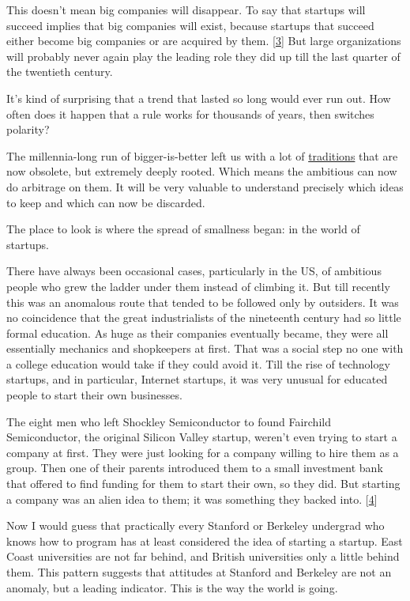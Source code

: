 This doesn't mean big companies will disappear. To say that startups
will succeed implies that big companies will exist, because startups
that succeed either become big companies or are acquired by them.
{[}\hyperref[f3n]{3}{]} But large organizations will probably never
again play the leading role they did up till the last quarter of the
twentieth century.

It's kind of surprising that a trend that lasted so long would ever run
out. How often does it happen that a rule works for thousands of years,
then switches polarity?

The millennia-long run of bigger-is-better left us with a lot of
\href{credentials.html}{traditions} that are now obsolete, but extremely
deeply rooted. Which means the ambitious can now do arbitrage on them.
It will be very valuable to understand precisely which ideas to keep and
which can now be discarded.

The place to look is where the spread of smallness began: in the world
of startups.

There have always been occasional cases, particularly in the US, of
ambitious people who grew the ladder under them instead of climbing it.
But till recently this was an anomalous route that tended to be followed
only by outsiders. It was no coincidence that the great industrialists
of the nineteenth century had so little formal education. As huge as
their companies eventually became, they were all essentially mechanics
and shopkeepers at first. That was a social step no one with a college
education would take if they could avoid it. Till the rise of technology
startups, and in particular, Internet startups, it was very unusual for
educated people to start their own businesses.

The eight men who left Shockley Semiconductor to found Fairchild
Semiconductor, the original Silicon Valley startup, weren't even trying
to start a company at first. They were just looking for a company
willing to hire them as a group. Then one of their parents introduced
them to a small investment bank that offered to find funding for them to
start their own, so they did. But starting a company was an alien idea
to them; it was something they backed into. {[}\hyperref[f4n]{4}{]}

Now I would guess that practically every Stanford or Berkeley undergrad
who knows how to program has at least considered the idea of starting a
startup. East Coast universities are not far behind, and British
universities only a little behind them. This pattern suggests that
attitudes at Stanford and Berkeley are not an anomaly, but a leading
indicator. This is the way the world is going.

